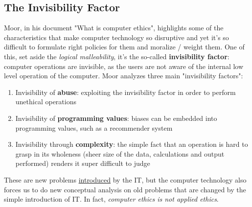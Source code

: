 \documentclass{article}
\begin{document}
		\subsection{The Invisibility Factor}
			Moor, in his document "What is computer ethics", highlights some of the characteristics that make computer technology so disruptive and yet it's so difficult to formulate right policies for them and moralize / weight them. One of this, set aside the \textit{logical malleability}, it's the so-called \textbf{invisibility factor}: computer operations are invisible, as the users are not aware of the internal low level operation of the computer. Moor analyzes three main "invisibility factors":
			\begin{enumerate}
				\item Invisibility of \textbf{abuse}: exploiting the invisibility factor in order to perform unethical operations
				\item Invisibility of \textbf{programming values}: biases can be embedded into programming values, such as a recommender system
				\item Invisibility through \textbf{complexity}: the simple fact that an operation is hard to grasp in its wholeness (sheer size of the data, calculations and output performed) renders it super difficult to judge
			\end{enumerate}
			These are new problems \underline{introduced} by the IT, but the computer technology also forces us to do new conceptual analysis on old problems that are changed by the simple introduction of IT. In fact, \textit{computer ethics is not applied ethics}.
\end{document}
